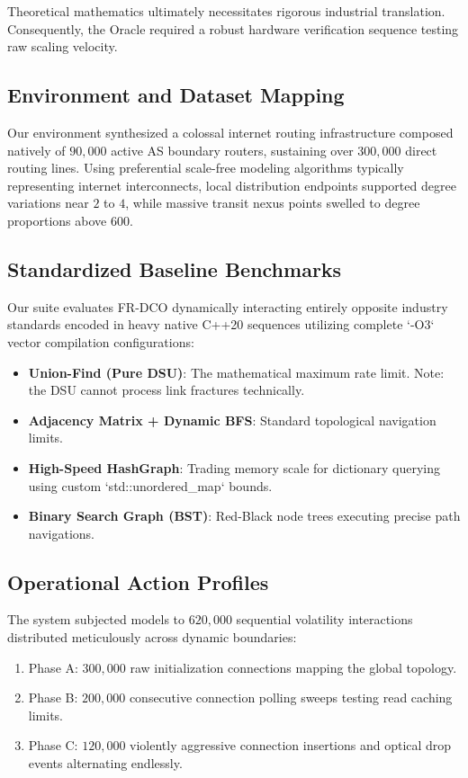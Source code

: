 \documentclass[runningheads]{llncs}
\begin{document}
Theoretical mathematics ultimately necessitates rigorous industrial translation. Consequently, the Oracle required a robust hardware verification sequence testing raw scaling velocity.

\subsection{Environment and Dataset Mapping}
Our environment synthesized a colossal internet routing infrastructure composed natively of $90,000$ active AS boundary routers, sustaining over $300,000$ direct routing lines. Using preferential scale-free modeling algorithms typically representing internet interconnects, local distribution endpoints supported degree variations near $2$ to $4$, while massive transit nexus points swelled to degree proportions above $600$.

\subsection{Standardized Baseline Benchmarks}
Our suite evaluates FR-DCO dynamically interacting entirely opposite industry standards encoded in heavy native C++20 sequences utilizing complete `-O3` vector compilation configurations:
\begin{itemize}
    \item \textbf{Union-Find (Pure DSU)}: The mathematical maximum rate limit. Note: the DSU cannot process link fractures technically.
    \item \textbf{Adjacency Matrix + Dynamic BFS}: Standard topological navigation limits.
    \item \textbf{High-Speed HashGraph}: Trading memory scale for dictionary querying using custom `std::unordered\_map` bounds.
    \item \textbf{Binary Search Graph (BST)}: Red-Black node trees executing precise path navigations.
\end{itemize}

\subsection{Operational Action Profiles}
The system subjected models to $620,000$ sequential volatility interactions distributed meticulously across dynamic boundaries:
\begin{enumerate}
    \item Phase A: $300,000$ raw initialization connections mapping the global topology.
    \item Phase B: $200,000$ consecutive connection polling sweeps testing read caching limits.
    \item Phase C: $120,000$ violently aggressive connection insertions and optical drop events alternating endlessly.
\end{enumerate}
\end{document}
